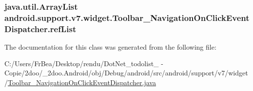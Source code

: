 \hypertarget{classandroid_1_1support_1_1v7_1_1widget_1_1_toolbar___navigation_on_click_event_dispatcher_eef471eae53fd88b0923df3fdf2fecfa}{
\subsubsection[{refList}]{\setlength{\rightskip}{0pt plus 5cm}java.util.ArrayList {\bf android.support.v7.widget.Toolbar\_\-NavigationOnClickEventDispatcher.refList}}}
\label{classandroid_1_1support_1_1v7_1_1widget_1_1_toolbar___navigation_on_click_event_dispatcher_eef471eae53fd88b0923df3fdf2fecfa}




The documentation for this class was generated from the following file:\begin{CompactItemize}
\item 
C:/Users/FrBea/Desktop/rendu/DotNet\_\-todolist\_ - Copie/2doo/\_\-2doo.Android/obj/Debug/android/src/android/support/v7/widget/\hyperlink{_toolbar___navigation_on_click_event_dispatcher_8java}{Toolbar\_\-NavigationOnClickEventDispatcher.java}\end{CompactItemize}
